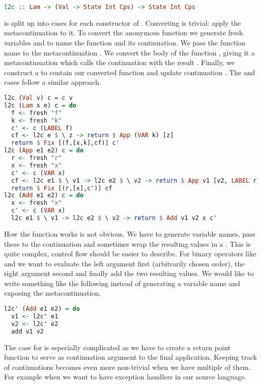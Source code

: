{\begin{lstlisting}[language=Haskell]
l2c :: Lam -> (Val -> State Int Cps) -> State Int Cps
\end{lstlisting}

 is split up into cases for each constructor of . Converting  is trivial: apply the metacontinuation  to it. To convert the anonymous function  we generate fresh variables  and  to name the function and its continuation. We pass the function name to the metacontinuation . We convert the body of the function , giving it a metacontinuation which calls the continuation with the result . Finally, we construct a  to contain our converted function and update continuation . The  and  cases follow a similar approach.

\begin{lstlisting}[language=Haskell]
l2c (Val v) c = c v
l2c (Lam x e) c = do
  f <- fresh "f"
  k <- fresh "k"
  c' <- c (LABEL f)
  cf <- l2c e $ \ z -> return $ App (VAR k) [z]
  return $ Fix [(f,[x,k],cf)] c'
l2c (App e1 e2) c = do
  r <- fresh "r"
  x <- fresh "x"
  c' <- c (VAR x)
  cf <- l2c e1 $ \ v1 -> l2c e2 $ \ v2 -> return $ App v1 [v2, LABEL r]
  return $ Fix [(r,[x],c')] cf
l2c (Add e1 e2) c = do
  x <- fresh "x"
  c' <- c (VAR x)
  l2c e1 $ \ v1 -> l2c e2 $ \ v2 -> return $ Add v1 v2 x c'
\end{lstlisting}

How the  function works is not obvious. We have to generate variable names, pass these to the continuation and sometimes wrap the resulting values in a . This is quite complex, control flow should be easier to describe. For binary operators like  and  we want to evaluate the left argument first (arbitrarily chosen order), the right argument second and finally add the two resulting values. We would like to write something like the following instead of generating a variable name and exposing the metacontinuation.

\begin{lstlisting}[language=Haskell]
l2c' (Add e1 e2) = do
  v1 <- l2c' e1
  v2 <- l2c' e2
  add v1 v2
\end{lstlisting}

The case for  is especially complicated as we have to create a return point function to serve as continuation argument to the final application. Keeping track of continuations becomes even more non-trivial when we have multiple of them. For example when we want to have exception handlers in our source language.

}
